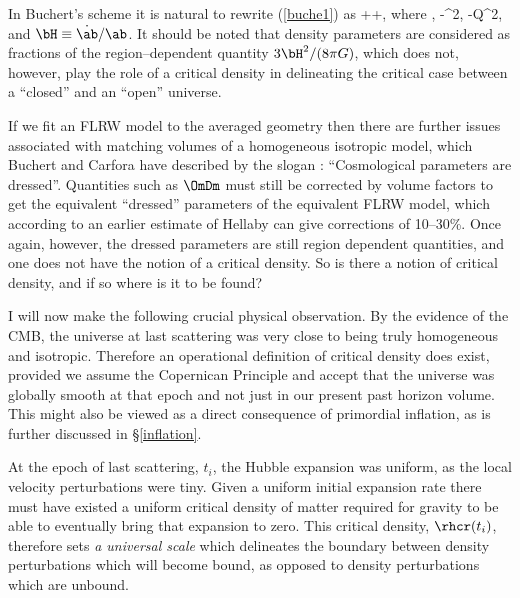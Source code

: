 \documentclass[12pt]{iopart}
\begin{document}
In Buchert's scheme it is natural to rewrite (\ref{buche1}) as
\beq
\OmDm+\OmDR+,\label{eqn0}
\eeq
where
\beq
\OmDm{},\qquad
\OmDR\equiv-{\bH^2},\qquad
\OmDQ\equiv-{{\cal Q}\bH^2},
\label{undress1}\eeq
and $\bH\equiv\dot\ab/\ab$. It should be noted that density parameters
are considered as fractions of the region--dependent quantity
$3\bH^2/(8\pi G)$, which does not, however, play the role of a critical
density in delineating the critical case between a ``closed'' and an ``open''
universe.

If we fit an FLRW model to the averaged geometry then there are further
issues associated with matching volumes of a homogeneous isotropic model,
which Buchert and Carfora have described by the slogan \cite{BC}:
``Cosmological parameters are dressed''. Quantities such as $\OmDm$ must still
be corrected by volume factors to get the equivalent ``dressed'' parameters
of the equivalent FLRW model, which according to an earlier estimate of
Hellaby \cite{Hellaby} can give corrections of 10--30\%. Once again, however,
the dressed parameters are still region dependent quantities, and one does
not have the notion of a critical density. So is there a notion of critical
density, and if so where is it to be found?

I will now make the following crucial physical observation. By the evidence
of the CMB, the universe at last scattering was very close to being truly
homogeneous and isotropic. Therefore
an operational definition of critical density does exist, provided we assume
the Copernican Principle and accept that the universe was globally smooth
at that epoch and not just in our present past horizon volume. This might
also be viewed as a direct consequence of primordial inflation, as is
further discussed in \S\ref{inflation}.

At the epoch of last scattering, $t_i$, the Hubble expansion was uniform, as
the local velocity perturbations were tiny. Given a uniform initial expansion
rate there must have existed a uniform critical density of matter required
for gravity to be able to eventually bring that expansion to zero. This
critical density, $\rhcr(t_i)$, therefore sets {\em a universal
scale} which delineates the boundary between density perturbations which
will become bound, as opposed to density perturbations which are unbound.
\end{document}
